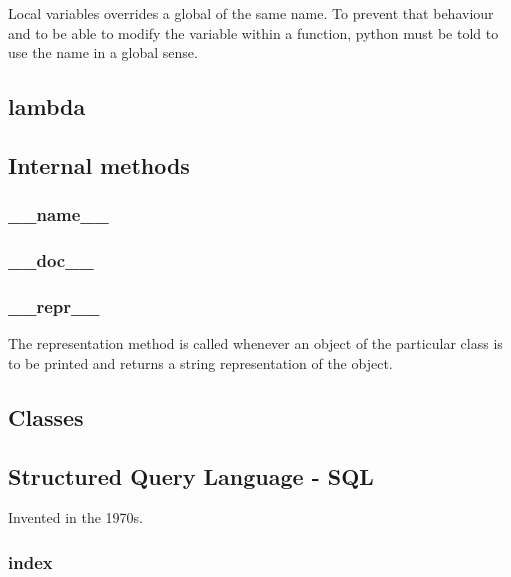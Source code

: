 \documentclass[12pt]{article}
\begin{document}
Local variables overrides a global of the same name. To prevent that behaviour and
to be able to modify the variable within a function, python must be told to use the
name in a global sense.




\subsection{lambda}




\subsection{Internal methods}

\subsubsection{\_\_name\_\_}



\subsubsection{\_\_doc\_\_}



\subsubsection{\_\_repr\_\_}

The representation method is called whenever an object of the particular class is to be printed and returns a string representation of the object.



\subsection{Classes}




\subsection{Structured Query Language - SQL}

Invented in the 1970s.



\subsubsection{index}
\end{document}
